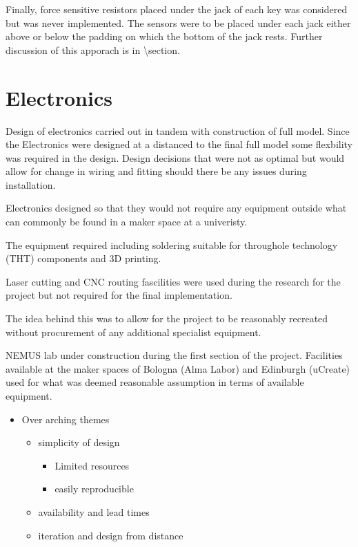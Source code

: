 Finally, force sensitive resistors placed under the jack of each key was
considered but was never implemented. The sensors were to be placed
under each jack either above or below the padding on which the bottom of
the jack rests. Further discussion of this apporach is in
\textbackslash section.

\section{Electronics}\label{electronics}

Design of electronics carried out in tandem with construction of full
model. Since the Electronics were designed at a distanced to the final
full model some flexbility was required in the design. Design decisions
that were not as optimal but would allow for change in wiring and
fitting should there be any issues during installation.

Electronics designed so that they would not require any equipment
outside what can commonly be found in a maker space at a univeristy.

The equipment required including soldering suitable for throughole
technology (THT) components and 3D printing.

Laser cutting and CNC routing fascilities were used during the research
for the project but not required for the final implementation.

The idea behind this was to allow for the project to be reasonably
recreated without procurement of any additional specialist equipment.

NEMUS lab under construction during the first section of the project.
Facilities available at the maker spaces of Bologna (Alma Labor) and
Edinburgh (uCreate) used for what was deemed reasonable assumption in
terms of available equipment.

\begin{itemize}
\item
  Over arching themes

  \begin{itemize}
  \item
    simplicity of design

    \begin{itemize}
    \item
      Limited resources
    \item
      easily reproducible
    \end{itemize}
  \item
    availability and lead times
  \item
    iteration and design from distance
  \end{itemize}
\end{itemize}

